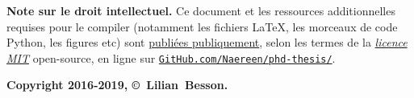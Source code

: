 \begin{resume_fr}
\vfill{}

\textbf{Note sur le droit intellectuel.}
%
Ce document et les ressources additionnelles requises pour le compiler (notamment les fichiers \LaTeX, les morceaux de code Python, les figures etc)
sont \href{https://github.com/Naereen/phd-thesis/}{publiées publiquement},
selon les termes de la \href{https://lbesson.mit-license.org/}{\emph{licence MIT}} open-source,
en ligne sur \href{https://github.com/Naereen/phd-thesis/}{\texttt{GitHub.com/Naereen/phd-thesis/}}.


\begin{center}
    \textbf{Copyright 2016-2019, \copyright ~Lilian~Besson.}
\end{center}


\end{resume_fr}
